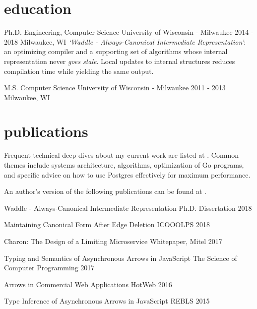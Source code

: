 \documentclass[]{clean-resume}
\begin{document}
\section{education}

\detailentry
  {Ph.D. Engineering, Computer Science}
  {University of Wisconsin - Milwaukee}
  {2014 - 2018}
  {Milwaukee, WI}
  {
    \emph{`Waddle - Always-Canonical Intermediate Representation'}: an optimizing compiler and a supporting set of algorithms whose internal representation never \emph{goes stale}. Local updates to internal structures reduces compilation time while yielding the same output.
  }

\detailentry
  {M.S. Computer Science}
  {University of Wisconsin - Milwaukee}
  {2011 - 2013}
  {Milwaukee, WI}
  {}

\section{publications}

Frequent technical deep-dives about my current work are listed at \articeslink. Common themes include systems architecture, algorithms, optimization of Go programs, and specific advice on how to use Postgres effectively for maximum performance.

An author's version of the following publications can be found at \paperslink.

\lineentry
  {Waddle - Always-Canonical Intermediate Representation}
  {Ph.D. Dissertation}
  {2018}

\lineentry
  {Maintaining Canonical Form After Edge Deletion}
  {ICOOOLPS}
  {2018}

\lineentry
  {Charon: The Design of a Limiting Microservice}
  {Whitepaper, Mitel}
  {2017}

\lineentry
  {Typing and Semantics of Asynchronous Arrows in JavaScript}
  {The Science of Computer Programming}
  {2017}

\lineentry
  {Arrows in Commercial Web Applications}
  {HotWeb}
  {2016}

\lineentry
  {Type Inference of Asynchronous Arrows in JavaScript}
  {REBLS}
  {2015}
\end{document}
